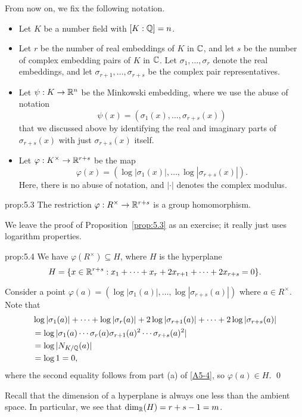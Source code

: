 From now on, we fix the following notation. 
\begin{itemize}
    \item Let $K$ be a number field with $[K : \mathbb{Q}] = n$. 
    \item Let $r$ be the number of real embeddings of $K$ in $\mathbb{C}$, and let 
    $s$ be the number of complex embedding pairs of $K$ in $\mathbb{C}$. 
    Let $\sigma_1, \dots, \sigma_r$ denote the real embeddings, and 
    let $\sigma_{r+1}, \dots, \sigma_{r+s}$ be the complex pair representatives.
    \item Let $\psi : K \to \mathbb{R}^n$ be the Minkowski embedding, where we 
    use the abuse of notation 
    \[ \psi(x) = (\sigma_1(x), \dots, \sigma_{r+s}(x)) \]
    that we discussed above by identifying the real and imaginary parts 
    of $\sigma_{r+s}(x)$ with just $\sigma_{r+s}(x)$ itself.
    \item Let $\varphi : K^\times \to \mathbb{R}^{r+s}$ be the map 
    \[ \varphi(x) = (\log|\sigma_1(x)|, \dots, \log|\sigma_{r+s}(x)|). \] 
    Here, there is no abuse of notation, and $|\cdot|$ denotes the 
    complex modulus.
\end{itemize}

\begin{prop}{prop:5.3}
    The restriction $\varphi : R^\times \to \mathbb{R}^{r+s}$ is a group homomorphism.
\end{prop}\vspace{-0.25cm}

We leave the proof of Proposition~\ref{prop:5.3} as an exercise; 
it really just uses logarithm properties.

\begin{prop}{prop:5.4}
    We have $\varphi(R^\times) \subseteq H$, where $H$ is the hyperplane 
    \[ H = \{x \in \mathbb{R}^{r+s} : x_1 + \cdots + x_r + 2x_{r+1} + \cdots + 2x_{r+s} = 0\}. \] 
\end{prop}\vspace{-0.25cm}
\begin{pf}
    Consider a point $\varphi(a) = (\log|\sigma_1(a)|, \dots, \log|\sigma_{r+s}(a)|)$
    where $a \in R^\times$. Note that 
    \begin{align*}
        &\log|\sigma_1(a)| + \cdots + \log|\sigma_r(a)| + 
        2\log|\sigma_{r+1}(a)| + \cdots + 2\log|\sigma_{r+s}(a)| \\
        &= \log|\sigma_1(a) \cdots \sigma_r(a) \sigma_{r+1}(a)^2 \cdots 
        \sigma_{r+s}(a)^2| \\ 
        &= \log |N_{K/\mathbb{Q}}(a)| \\ 
        &= \log 1 = 0, 
    \end{align*}
    where the second equality follows from part (a) of \ref{A5-4}, so 
    $\varphi(a) \in H$. \qed 
\end{pf}\vspace{-0.25cm}
Recall that the dimension of a hyperplane is always one less than the ambient 
space. In particular, we see that $\dim_{\mathbb{R}}(H) = r + s - 1 = m$. 